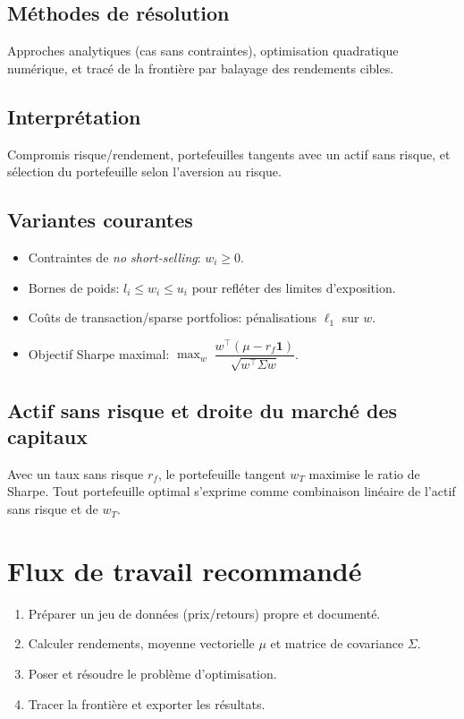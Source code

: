 \documentclass[11pt,a4paper]{article}
\begin{document}
\subsection{Méthodes de résolution}
Approches analytiques (cas sans contraintes), optimisation quadratique numérique, et tracé de la frontière par balayage des rendements cibles.

\subsection{Interprétation}
Compromis risque/rendement, portefeuilles tangents avec un actif sans risque, et sélection du portefeuille selon l'aversion au risque.

\subsection{Variantes courantes}
\begin{itemize}
  \item Contraintes de \emph{no short-selling}: $w_i \ge 0$.
  \item Bornes de poids: $l_i \le w_i \le u_i$ pour refl\'eter des limites d'exposition.
  \item Co\^uts de transaction/sparse portfolios: pénalisations $\ell_1$ sur $w$.
  \item Objectif Sharpe maximal: $\max_w \; \dfrac{w^\top (\mu - r_f \mathbf{1})}{\sqrt{w^\top \Sigma w}}$.
\end{itemize}

\subsection{Actif sans risque et droite du marché des capitaux}
Avec un taux sans risque $r_f$, le portefeuille tangent $w_T$ maximise le ratio de Sharpe. Tout portefeuille optimal s'exprime comme combinaison lin\'eaire de l'actif sans risque et de $w_T$.

\section{Flux de travail recommandé}
\begin{enumerate}[label=\arabic*)]
  \item Préparer un jeu de données (prix/retours) propre et documenté.
  \item Calculer rendements, moyenne vectorielle $\mu$ et matrice de covariance $\Sigma$.
  \item Poser et résoudre le problème d'optimisation.
  \item Tracer la frontière et exporter les résultats.
\end{enumerate}
\end{document}
